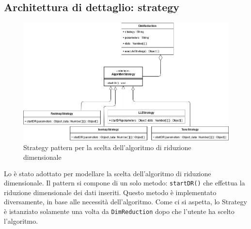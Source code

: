 \subsection{Architettura di dettaglio: strategy}
\begin{figure}[hb]
	\includegraphics[width=15.8cm]{Images/StrategyPattern}
	\centering
	\caption{Strategy pattern per la scelta dell'algoritmo di riduzione dimensionale}
\end{figure}
Lo  è stato adottato per modellare la scelta dell'algoritmo di riduzione dimensionale. Il pattern si compone di un solo metodo: \texttt{startDR()} che effettua la riduzione dimensionale dei dati inseriti. Questo metodo è implementato diversamente, in base alle necessità dell'algoritmo. Come ci si aspetta, lo Strategy è istanziato solamente una volta da \texttt{DimReduction} dopo che l'utente ha scelto l'algoritmo.
